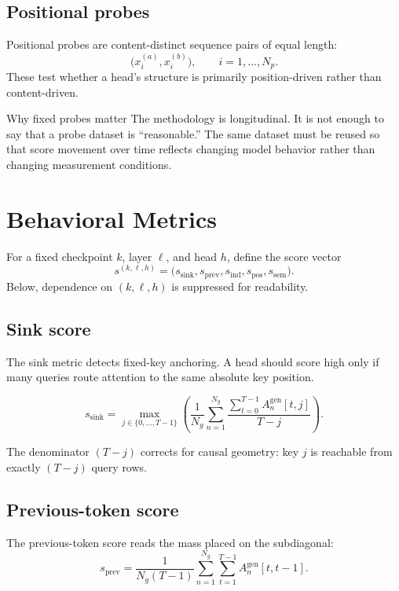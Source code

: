 \documentclass[11pt]{article}
\newcommand{\1}{\mathbf{1}}
\begin{document}
\subsection{Positional probes}

Positional probes are content-distinct sequence pairs of equal length:
\[
\bigl(x_i^{(a)},x_i^{(b)}\bigr), \qquad i=1,\dots,N_p.
\]
These test whether a head's structure is primarily position-driven rather than
content-driven.

\begin{accentbox}{Why fixed probes matter}
The methodology is longitudinal. It is not enough to say that a probe dataset is
``reasonable.'' The same dataset must be reused so that score movement over time
reflects changing model behavior rather than changing measurement conditions.
\end{accentbox}

\section{Behavioral Metrics}

For a fixed checkpoint $k$, layer $\ell$, and head $h$, define the score vector
\[
s^{(k,\ell,h)} =
\bigl(s_{\mathrm{sink}}, s_{\mathrm{prev}}, s_{\mathrm{ind}},
s_{\mathrm{pos}}, s_{\mathrm{sem}}\bigr).
\]
Below, dependence on $(k,\ell,h)$ is suppressed for readability.

\subsection{Sink score}

The sink metric detects fixed-key anchoring. A head should score high only if
many queries route attention to the same absolute key position.

\[
s_{\mathrm{sink}}
=
\max_{j \in \{0,\dots,T-1\}}
\left(
\frac{1}{N_g}
\sum_{n=1}^{N_g}
\frac{\sum_{t=0}^{T-1} A_n^{\mathrm{gen}}[t,j]}{T-j}
\right).
\]

The denominator $(T-j)$ corrects for causal geometry: key $j$ is reachable from
exactly $(T-j)$ query rows.

\subsection{Previous-token score}

The previous-token score reads the mass placed on the subdiagonal:
\[
s_{\mathrm{prev}}
=
\frac{1}{N_g(T-1)}
\sum_{n=1}^{N_g}
\sum_{t=1}^{T-1}
A_n^{\mathrm{gen}}[t,t-1].
\]
\end{document}
